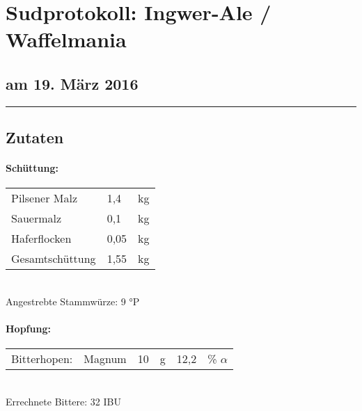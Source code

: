 \documentclass[12pt,oneside,a4paper]{scrartcl}
\begin{document}
	\begin{minipage}[c]{0.70\textwidth}
		\section*{\hspace{-.4cm}Sudprotokoll: Ingwer-Ale / Waffelmania}
	\end{minipage}
	\begin{minipage}[c]{0.29\textwidth}
		\subsection*{am 19. März 2016}
	\end{minipage}
	\rule{\textwidth}{1pt}
%
\subsection*{Zutaten}
%
\paragraph{Schüttung:}
	\begin{tabular}[t]{m{8cm} m{2cm} m{1cm}}
		Pilsener Malz & 1,4 & kg\bigstrut\\
		Sauermalz & 0,1 & kg\bigstrut\\
		Haferflocken & 0,05 & kg \bigstrut\\ \hline
		Gesamtschüttung & 1,55 & kg\bigstrut
	\end{tabular}\\

\vspace{.25cm}
\hspace{1cm}Angestrebte Stammwürze: 9 °P
%
\paragraph{Hopfung:}
	\begin{tabular}[t]{m{2cm} m{5cm} m{0.5cm} m{1cm} m{0.5cm} m{1cm}}
		Bitterhopen: & Magnum & 10 & g & 12,2 & \% $\alpha$ \\
	\end{tabular}\\

\vspace{.25cm}
\hspace{1cm}Errechnete Bittere: 32 IBU
%
\end{document}
